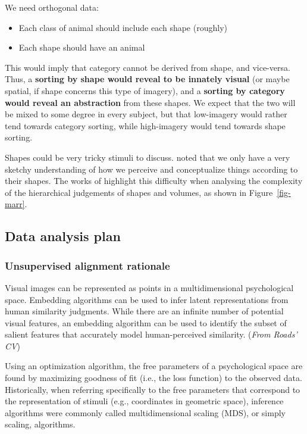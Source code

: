 \documentclass[
  authoryear]{elsarticle}
\begin{document}
We need orthogonal data:

\begin{itemize}
\item
  Each class of animal should include each shape (roughly)
\item
  Each shape should have an animal
\end{itemize}

This would imply that category cannot be derived from shape, and
vice-versa. Thus, a \textbf{sorting by shape would reveal to be innately
visual} (or maybe spatial, if shape concerns this type of imagery), and
a \textbf{sorting by category would reveal an abstraction} from these
shapes. We expect that the two will be mixed to some degree in every
subject, but that low-imagery would rather tend towards category
sorting, while high-imagery would tend towards shape sorting.

Shapes could be very tricky stimuli to discuss.
\citet{gardenforsConceptualSpacesFramework2004} noted that we only have
a very sketchy understanding of how we perceive and conceptualize things
according to their shapes. The works of \citet{marr1997} highlight this
difficulty when analysing the complexity of the hierarchical judgements
of shapes and volumes, as shown in Figure~\ref{fig-marr}.

\subsection{Data analysis plan}\label{data-analysis-plan}

\subsubsection{Unsupervised alignment
rationale}\label{unsupervised-alignment-rationale}

Visual images can be represented as points in a multidimensional
psychological space. Embedding algorithms can be used to infer latent
representations from human similarity judgments. While there are an
infinite number of potential visual features, an embedding algorithm can
be used to identify the subset of salient features that accurately model
human-perceived similarity. (\emph{From Roads' CV})

Using an optimization algorithm, the free parameters of a psychological
space are found by maximizing goodness of fit (i.e., the loss function)
to the observed data. Historically, when referring specifically to the
free parameters that correspond to the representation of stimuli (e.g.,
coordinates in geometric space), inference algorithms were commonly
called multidimensional scaling (MDS), or simply scaling, algorithms.
\end{document}
